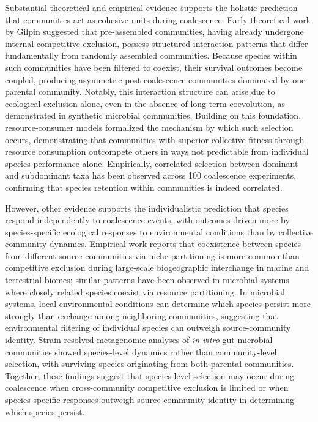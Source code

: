 Substantial theoretical and empirical evidence supports the holistic prediction that communities act as cohesive units during coalescence. Early theoretical work by Gilpin\citep{Gilpin1994} suggested that pre-assembled communities, having already undergone internal competitive exclusion, possess structured interaction patterns that differ fundamentally from randomly assembled communities. Because species within such communities have been filtered to coexist, their survival outcomes become coupled, producing asymmetric post-coalescence communities dominated by one parental community\citep{Debray2022}. Notably, this interaction structure can arise due to ecological exclusion alone, even in the absence of long-term coevolution, as demonstrated in synthetic microbial communities\citep{Venturelli2018, Maynard2020}. Building on this foundation, resource-consumer models formalized the mechanism by which such selection occurs, demonstrating that communities with superior collective fitness through resource consumption outcompete others in ways not predictable from individual species performance alone\citep{Tikhonov2016, Lechon2021, Xie2019, Xie2021}. Empirically, correlated selection between dominant and subdominant taxa has been observed across 100 coalescence experiments, confirming that species retention within communities is indeed correlated\citep{DiazColunga2022}. 

However, other evidence supports the individualistic prediction that species respond independently to coalescence events, with outcomes driven more by species-specific ecological responses to environmental conditions than by collective community dynamics. Empirical work reports that coexistence between species from different source communities via niche partitioning is more common than competitive exclusion during large-scale biogeographic interchange in marine and terrestrial biomes\citep{Vermeij1991}; similar patterns have been observed in microbial systems where closely related species coexist via resource partitioning\citep{Brochet2021}. In microbial systems, local environmental conditions can determine which species persist more strongly than exchange among neighboring communities, suggesting that environmental filtering of individual species can outweigh source-community identity\citep{VanderGucht2007}. Strain-resolved metagenomic analyses of \textit{in vitro} gut microbial communities showed species-level dynamics rather than community-level selection, with surviving species originating from both parental communities\citep{Goldman2025, Walton2025}. Together, these findings suggest that species-level selection may occur during coalescence when cross-community competitive exclusion is limited or when species-specific responses outweigh source-community identity in determining which species persist.

